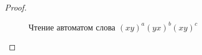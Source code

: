 \documentclass{article}
\begin{document}
\begin{proof}
\begin{enumerate}
			\begin{figure}
				\caption{Чтение автоматом слова $(xy)^a(yx)^b(xy)^c$}
				\label{process1_cycle_a+b_a+c}
			\end{figure}
			
		\end{enumerate}
	\end{proof}
\end{document}
